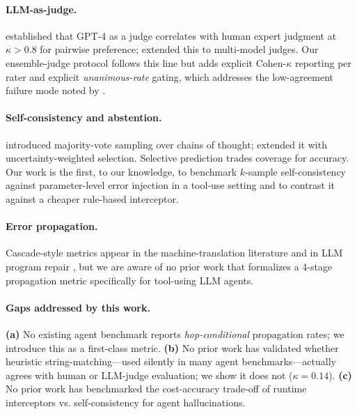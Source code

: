 \documentclass[11pt]{article}
\begin{document}
\paragraph{LLM-as-judge.} \citet{judging-llm-judge} established that GPT-4 as a judge correlates with human expert judgment at $\kappa > 0.8$ for pairwise preference; \citet{pandalm} extended this to multi-model judges. Our ensemble-judge protocol follows this line but adds explicit Cohen-$\kappa$ reporting per rater and explicit \emph{unanimous-rate} gating, which addresses the low-agreement failure mode noted by \citet{chiang-closer-look}.

\paragraph{Self-consistency and abstention.} \citet{self-consistency} introduced majority-vote sampling over chains of thought; \citet{active-prompting} extended it with uncertainty-weighted selection. Selective prediction \citep{selective-prediction, abstain-or-not} trades coverage for accuracy. Our work is the first, to our knowledge, to benchmark $k$-sample self-consistency against parameter-level error injection in a tool-use setting and to contrast it against a cheaper rule-based interceptor.

\paragraph{Error propagation.} Cascade-style metrics appear in the machine-translation literature \citep{mt-cascade} and in LLM program repair \citep{program-repair-cascade}, but we are aware of no prior work that formalizes a 4-stage propagation metric specifically for tool-using LLM agents.

\paragraph{Gaps addressed by this work.}
\textbf{(a)} No existing agent benchmark reports \emph{hop-conditional} propagation rates; we introduce this as a first-class metric. \textbf{(b)} No prior work has validated whether heuristic string-matching---used silently in many agent benchmarks---actually agrees with human or LLM-judge evaluation; we show it does not ($\kappa\!=\!0.14$). \textbf{(c)} No prior work has benchmarked the cost-accuracy trade-off of runtime interceptors vs. self-consistency for agent hallucinations.

\end{document}
